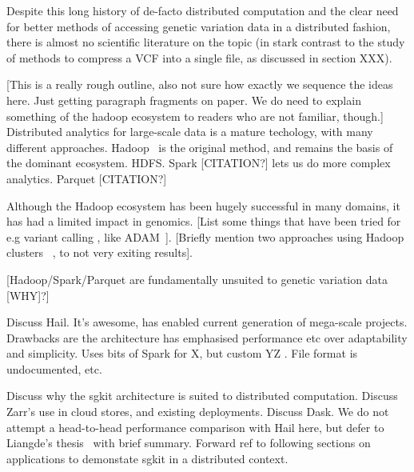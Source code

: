 \documentclass[a4paper,num-refs]{oup-contemporary}
\begin{document}
Despite this long history of de-facto distributed computation
and the clear need for better methods of accessing genetic
variation data in a distributed fashion, there is almost
no scientific literature on the topic (in stark contrast to the
study of methods to compress a VCF into a single file,
as discussed in section XXX).

[This is a really rough outline, also not sure how exactly
we sequence the ideas here. Just getting paragraph fragments
on paper. We do need to explain something of the hadoop ecosystem
to readers who are not familiar, though.]
Distributed analytics for large-scale data is a mature
techology, with many different approaches. Hadoop~\citep{white2012hadoop}
is the original method, and remains the basis of the
dominant ecosystem. HDFS. Spark [CITATION?] lets us
do more complex analytics. Parquet [CITATION?]

Although the Hadoop ecosystem has been hugely successful
in many domains, it has had a limited impact in genomics.
[List some things that have been tried for e.g variant calling
, like ADAM~\citep{nothaft2015rethinking}].
[Briefly mention two approaches using Hadoop clusters
~\citep{boufea2017managing,fan2020variant}, to not very
exiting results].

[Hadoop/Spark/Parquet are fundamentally unsuited to genetic
variation data [WHY]?]

Discuss Hail. It's awesome, has enabled current
generation of mega-scale projects. Drawbacks are the
architecture has emphasised performance etc over adaptability
and simplicity. Uses bits of Spark for X, but custom YZ .
File format is undocumented, etc.

Discuss why the sgkit architecture is suited to distributed
computation. Discuss Zarr's use in cloud stores, and existing
deployments. Discuss Dask.
We do not attempt a head-to-head performance comparison with
Hail here, but defer to Liangde's thesis~\citep{li2022efficient}
with brief summary.
Forward ref to following sections on applications to demonstate
sgkit in a distributed context.
\end{document}
